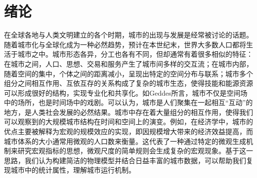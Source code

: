 \chapter{绪论}

\setcounter{page}{1}

在全球各地与人类文明建立的各个时期，城市的出现与发展是经常被讨论的话题。随着城市化与全球化成为一种必然趋势，预计在本世纪末，世界大多数人口都将生活于城市之中\cite{batty2013}。城市形态各异，分工也各有不同，但却通常有着很多相似的特征：在城市之间，人口、思想、交易和服务产生了城市间多样的交互流；在城市内部，随着空间的集中，个体之间的距离减小，呈现出特定的空间分布与联系；城市多个组分之间相互作用、互依互存的关系构成了复杂的城市生态，使得技能和能源资源可以形成很好的结构，实现专业化和共享化。如Geddes所言，城市不仅是空间场中的场所，也是时间场中的戏剧\cite{geddes1904}。可以认为，城市是人们聚集在一起相互“互动”的地方，是人类社会发展的必然结果。城市中存在着大量组分的相互作用，使得我们可以观察到的大规模城市结构在时间和空间上的演变\cite{Barthelemy2019}。例如，在经济学中，城市的优点主要被解释为宏观的规模效应的实现，即因规模增大带来的经济效益提高，而城市体系的大小通常用微观的人口数来衡量。这代表了一种通过特定的微观生成机制来研究宏观指标的思想，微观尺度的简单规则会生成复杂的宏观现象。基于这一思路，我们认为构建简洁的物理模型并结合日益丰富的城市数据，可以帮助我们复现城市中的统计属性，理解城市运行机制。

